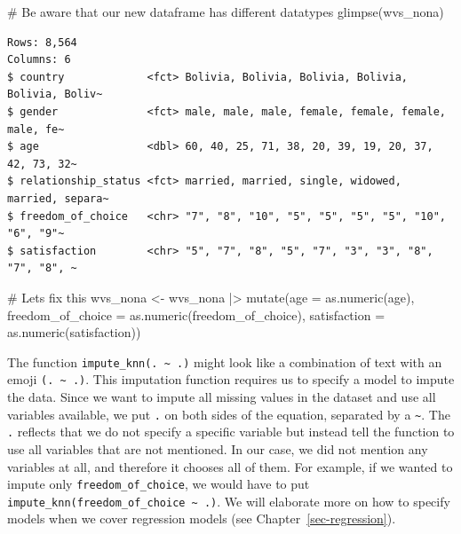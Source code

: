 \documentclass[
  letterpaper,
]{krantz}
\makeatletter
\newenvironment{Shaded}{\begin{snugshade}}{\end{snugshade}}
\newcommand{\AttributeTok}[1]{\textcolor[rgb]{0.40,0.45,0.13}{#1}}
\newcommand{\CommentTok}[1]{\textcolor[rgb]{0.37,0.37,0.37}{#1}}
\newcommand{\FunctionTok}[1]{\textcolor[rgb]{0.28,0.35,0.67}{#1}}
\newcommand{\NormalTok}[1]{\textcolor[rgb]{0.00,0.23,0.31}{#1}}
\newcommand{\OtherTok}[1]{\textcolor[rgb]{0.00,0.23,0.31}{#1}}
\newcommand{\SpecialCharTok}[1]{\textcolor[rgb]{0.37,0.37,0.37}{#1}}
\newenvironment{kframe}{%
\medskip{}
\setlength{\fboxsep}{.8em}
 \def\at@end@of@kframe{}%
 \ifinner\ifhmode%
  \def\at@end@of@kframe{\end{minipage}}%
  \begin{minipage}{\columnwidth}%
 \fi\fi%
 \def\FrameCommand##1{\hskip\@totalleftmargin \hskip-\fboxsep
 \colorbox{shadecolor}{##1}\hskip-\fboxsep
     \hskip-\linewidth \hskip-\@totalleftmargin \hskip\columnwidth}%
 \MakeFramed {\advance\hsize-\width
   \@totalleftmargin\z@ \linewidth\hsize
   \@setminipage}}%
 {\par\unskip\endMakeFramed%
 \at@end@of@kframe}
\renewenvironment{Shaded}{\begin{kframe}}{\end{kframe}}
\makeatother
\begin{document}
\begin{Shaded}
\begin{Highlighting}[]
\CommentTok{\# Be aware that our new dataframe has different datatypes}
\FunctionTok{glimpse}\NormalTok{(wvs\_nona)}
\end{Highlighting}
\end{Shaded}

\begin{verbatim}
Rows: 8,564
Columns: 6
$ country             <fct> Bolivia, Bolivia, Bolivia, Bolivia, Bolivia, Boliv~
$ gender              <fct> male, male, male, female, female, female, male, fe~
$ age                 <dbl> 60, 40, 25, 71, 38, 20, 39, 19, 20, 37, 42, 73, 32~
$ relationship_status <fct> married, married, single, widowed, married, separa~
$ freedom_of_choice   <chr> "7", "8", "10", "5", "5", "5", "5", "10", "6", "9"~
$ satisfaction        <chr> "5", "7", "8", "5", "7", "3", "3", "8", "7", "8", ~
\end{verbatim}

\begin{Shaded}
\begin{Highlighting}[]
\CommentTok{\# Let\textquotesingle{}s fix this}
\NormalTok{wvs\_nona }\OtherTok{\textless{}{-}}
\NormalTok{  wvs\_nona }\SpecialCharTok{|\textgreater{}}
  \FunctionTok{mutate}\NormalTok{(}\AttributeTok{age =} \FunctionTok{as.numeric}\NormalTok{(age),}
         \AttributeTok{freedom\_of\_choice =} \FunctionTok{as.numeric}\NormalTok{(freedom\_of\_choice),}
         \AttributeTok{satisfaction =} \FunctionTok{as.numeric}\NormalTok{(satisfaction))}
\end{Highlighting}
\end{Shaded}

The function \texttt{impute\_knn(.\ \textasciitilde{}\ .)} might look
like a combination of text with an emoji
\texttt{(.\ \textasciitilde{}\ .)}. This imputation function requires us
to specify a model to impute the data. Since we want to impute all
missing values in the dataset and use all variables available, we put
\texttt{.} on both sides of the equation, separated by a
\texttt{\textasciitilde{}}. The \texttt{.} reflects that we do not
specify a specific variable but instead tell the function to use all
variables that are not mentioned. In our case, we did not mention any
variables at all, and therefore it chooses all of them. For example, if
we wanted to impute only \texttt{freedom\_of\_choice}, we would have to
put \texttt{impute\_knn(freedom\_of\_choice\ \textasciitilde{}\ .)}. We
will elaborate more on how to specify models when we cover regression
models (see Chapter~\ref{sec-regression}).
\end{document}
